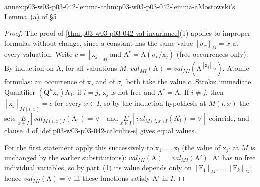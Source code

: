 \begin{annexitem}{annex:p03-w03-p03-042-lemma-a}{thm:p03-w03-p03-042-lemma-a}{Mostowski's Lemma~(a) of \S5}
\begin{proof}
The proof of \cref{thm:p03-w03-p03-042-val-invariance}(1) applies to
improper formulas without change, since a constant has the same value
\([\sigma_x]_M=x\) at every valuation.  Write \(c=[\mathrm x_j]_M\) and
\(\mathrm A^c=\mathrm A(\sigma_c/\mathrm x_j)\) (free occurrences only).
By induction on \(\mathrm A\), for all valuations \(M\):
\(\mathit{val}_{MI}(\mathrm A)=\mathit{val}_{MI}(\mathrm A^{[\mathrm
x_j]_M})\).  Atomic formulas: an occurrence of \(\mathrm x_j\) and of
\(\sigma_c\) both take the value \(c\).  Stroke: immediate.  Quantifier
\((\mathbf Q^h\mathrm x_i)\mathrm A_1\): if \(i=j\), \(\mathrm x_j\) is not
free and \(\mathrm A^c=\mathrm A\).  If \(i\neq j\), then
\([\mathrm x_j]_{M(i,x)}=c\) for every \(x\in I\), so by the induction
hypothesis at \(M(i,x)\) the sets \(\underset{x\in I}{E}[\mathit{val}_{M(i,x)I}
(\mathrm A_1)=\vee]\) and \(\underset{x\in I}{E}[\mathit{val}_{M(i,x)I}
(\mathrm A_1^c)=\vee]\) coincide, and clause~4 of
\cref{def:p03-w03-p03-042-calculus-s} gives equal values.

For the first statement apply this successively to \(\mathrm x_1,\ldots,
\mathrm x_l\) (the value of \(\mathrm x_{j'}\) at \(M\) is unchanged by the
earlier substitutions): \(\mathit{val}_{MI}(\mathrm A)=\mathit{val}_{MI}
(\mathrm A')\).  \(\mathrm A'\) has no free individual variables, so by
part~(1) its value depends only on \([\mathrm F_1]_M,\ldots,[\mathrm
F_k]_M\); hence \(\mathit{val}_{MI}(\mathrm A)=\vee\) iff these functions
satisfy \(\mathrm A'\) in \(I\).
\end{proof}
\end{annexitem}

